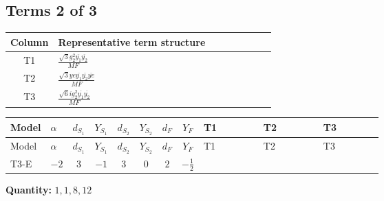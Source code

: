 \documentclass[8pt]{article}
\begin{document}
\begin{landscape}
\subsection*{Terms 2 of 3}
\begin{center}
\begin{tabular}{@{}c >{\raggedright\arraybackslash}p{0.82\linewidth}@{}}
\toprule
Column & Representative term structure \\
\midrule
T1 & \(\displaystyle \frac{\sqrt{3} g_{2}^{2} \overline{y_{1}} \overline{y_{2}}}{MF}\) \\
\midrule
T2 & \(\displaystyle \frac{\sqrt{3} ye \overline{y_{1}} \overline{y_{2}} \overline{ye}}{MF}\) \\
\midrule
T3 & \(\displaystyle \frac{\sqrt{6} i g_{2}^{2} \overline{y_{1}} \overline{y_{2}}}{MF}\) \\
\midrule
\bottomrule
\end{tabular}
\end{center}
\smallskip
\tiny
\begin{longtable}{@{}llcccccc >{\raggedright\arraybackslash}p{0.21\linewidth} >{\raggedright\arraybackslash}p{0.21\linewidth} >{\raggedright\arraybackslash}p{0.21\linewidth}@{}}
\toprule
Model & $\alpha$ & $d_{S_1}$ & $Y_{S_1}$ & $d_{S_2}$ & $Y_{S_2}$ & $d_F$ & $Y_F$ & T1 & T2 & T3 \\
\midrule
\endfirsthead
\toprule
Model & $\alpha$ & $d_{S_1}$ & $Y_{S_1}$ & $d_{S_2}$ & $Y_{S_2}$ & $d_F$ & $Y_F$ & T1 & T2 & T3 \\
\midrule
\endhead
T3-E & $-2$ & $3$ & $-1$ & $3$ & $0$ & $2$ & $-\frac{1}{2}$ & \scriptsize\adjustbox{max width=\linewidth}{$\begin{gathered} \frac{49 \sqrt{3} g_{2}^{2} \overline{y_{1}} \overline{y_{2}}}{24 MF}\end{gathered}$} & \scriptsize\adjustbox{max width=\linewidth}{$\begin{gathered} - \frac{\sqrt{3} ye \overline{y_{1}} \overline{y_{2}} \overline{ye}}{12 MF}\end{gathered}$} & \scriptsize\adjustbox{max width=\linewidth}{$\begin{gathered} \frac{\sqrt{6} i g_{2}^{2} \overline{y_{1}} \overline{y_{2}}}{3 MF}\end{gathered}$} \\
\midrule
\bottomrule
\end{longtable}
\clearpage
\noindent\textbf{Quantity: }$\mathrm{1,1,8,12}$\par\smallskip

\end{landscape}
\end{document}
